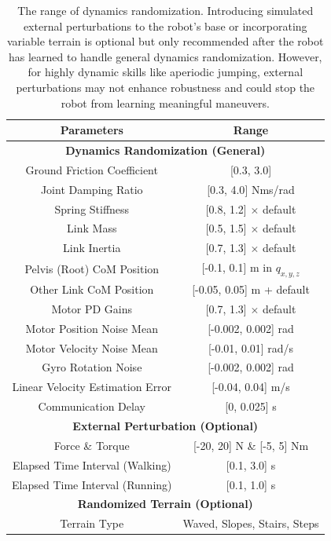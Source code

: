 \begin{table}[]
\scriptsize
\caption{The range of dynamics randomization. Introducing simulated external perturbations to the robot's base or incorporating variable terrain is optional but only recommended after the robot has learned to handle general dynamics randomization. However, for highly dynamic skills like aperiodic jumping, external perturbations may not enhance robustness and could stop the robot from learning meaningful maneuvers.}
\centering
\label{tab:randomization}
\begin{tabular}{cc}
\hline
\textbf{Parameters}              & \textbf{Range}                    \\ \hline
\multicolumn{2}{c}{\textbf{Dynamics Randomization (General)}}        \\ \hline
Ground Friction Coefficient             & {[}0.3, 3.0{]}                    \\
Joint Damping Ratio              & {[}0.3, 4.0{]} Nms/rad            \\
Spring Stiffness                 & {[}0.8, 1.2{]} $\times$ default   \\
Link Mass                        & {[}0.5, 1.5{]} $\times$ default   \\
Link Inertia                     & {[}0.7, 1.3{]} $\times$ default   \\
Pelvis (Root) CoM Position   & {[}-0.1, 0.1{]} m in $q_{x,y,z}$  \\
Other Link CoM Position      & {[}-0.05, 0.05{]} m + default     \\
Motor PD Gains                   & {[}0.7, 1.3{]} $\times$ default   \\
Motor Position Noise Mean        & {[}-0.002, 0.002{]} rad           \\
Motor Velocity Noise Mean        & {[}-0.01, 0.01{]} rad/s           \\
Gyro Rotation Noise              & {[}-0.002, 0.002{]} rad           \\
Linear Velocity Estimation Error & {[}-0.04, 0.04{]} m/s             \\
Communication Delay              & {[}0, 0.025{]} s                \\ \hline
\multicolumn{2}{c}{\textbf{External Perturbation (Optional)}}        \\ \hline
Force \& Torque                  & {[}-20, 20{]} N \& {[}-5, 5{]} Nm \\
Elapsed Time Interval (Walking)            & {[}0.1, 3.0{]} s                \\ 
Elapsed Time Interval (Running)            & {[}0.1, 1.0{]} s                \\ \hline
\multicolumn{2}{c}{\textbf{Randomized Terrain (Optional)}}           \\ \hline
Terrain Type                     & Waved, Slopes, Stairs, Steps      \\ \hline
\end{tabular}
\end{table}